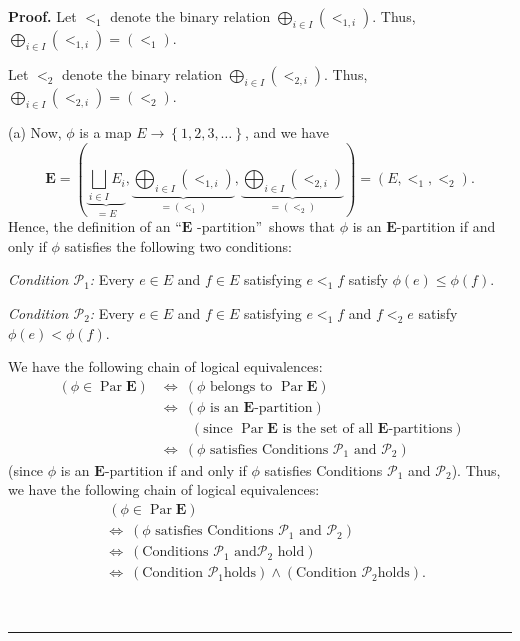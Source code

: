 \documentclass[numbers=enddot,12pt,final,onecolumn,notitlepage,abstracton]{scrartcl}
\theoremstyle{definition}
\newenvironment{proof}[1][Proof]{\noindent\textbf{#1.} }{\ \rule{0.5em}{0.5em}}
\newenvironment{verlong}{}{}
\begin{document}
\begin{verlong}
\begin{footnotesize}
\begin{proof}
Let $<_{1}$ denote the binary relation $\bigoplus_{i\in I}\left(
<_{1,i}\right)  $. Thus, $\bigoplus_{i\in I}\left(  <_{1,i}\right)  =\left(
<_{1}\right)  $.

Let $<_{2}$ denote the binary relation $\bigoplus_{i\in I}\left(
<_{2,i}\right)  $. Thus, $\bigoplus_{i\in I}\left(  <_{2,i}\right)  =\left(
<_{2}\right)  $.

(a) Now, $\phi$ is a map $E\rightarrow\left\{  1,2,3,\ldots\right\}  $, and we
have%
\[
\mathbf{E}=\left(  \underbrace{\bigsqcup_{i\in I}E_{i}}_{=E}%
,\underbrace{\bigoplus_{i\in I}\left(  <_{1,i}\right)  }_{=\left(
<_{1}\right)  },\underbrace{\bigoplus_{i\in I}\left(  <_{2,i}\right)
}_{=\left(  <_{2}\right)  }\right)  =\left(  E,<_{1},<_{2}\right)  .
\]
Hence, the definition of an \textquotedblleft$\mathbf{E}$%
-partition\textquotedblright\ shows that $\phi$ is an $\mathbf{E}$-partition
if and only if $\phi$ satisfies the following two conditions:

\textit{Condition $\mathcal{P}$}$_{1}$\textit{:} Every $e\in E$ and $f\in E$
satisfying $e<_{1}f$ satisfy $\phi\left(  e\right)  \leq\phi\left(  f\right)
$.

\textit{Condition $\mathcal{P}$}$_{2}$\textit{:} Every $e\in E$ and $f\in E$
satisfying $e<_{1}f$ and $f<_{2}e$ satisfy $\phi\left(  e\right)  <\phi\left(
f\right)  $.

We have the following chain of logical equivalences:%
\begin{align*}
\ \left(  \phi\in\operatorname*{Par}\mathbf{E}\right)   &  \Longleftrightarrow
\ \left(  \phi\text{ belongs to }\operatorname*{Par}\mathbf{E}\right) \\
&  \Longleftrightarrow\ \left(  \phi\text{ is an }\mathbf{E}\text{-partition}%
\right) \\
&  \ \ \ \ \ \ \ \ \ \ \left(  \text{since }\operatorname*{Par}\mathbf{E}%
\text{ is the set of all }\mathbf{E}\text{-partitions}\right) \\
&  \Longleftrightarrow\ \left(  \phi\text{ satisfies Conditions }%
\mathcal{P}_{1}\text{ and }\mathcal{P}_{2}\right)
\end{align*}
(since $\phi$ is an $\mathbf{E}$-partition if and only if $\phi$ satisfies
Conditions $\mathcal{P}_{1}$ and $\mathcal{P}_{2}$). Thus, we have the
following chain of logical equivalences:%
\begin{align}
&  \ \left(  \phi\in\operatorname*{Par}\mathbf{E}\right) \nonumber\\
&  \Longleftrightarrow\ \left(  \phi\text{ satisfies Conditions }%
\mathcal{P}_{1}\text{ and }\mathcal{P}_{2}\right) \nonumber\\
&  \Longleftrightarrow\ \left(  \text{Conditions }\mathcal{P}_{1}\text{ and
}\mathcal{P}_{2}\text{ hold}\right) \nonumber\\
&  \Longleftrightarrow\ \left(  \text{Condition }\mathcal{P}_{1}\text{
holds}\right)  \wedge\left(  \text{Condition }\mathcal{P}_{2}\text{
holds}\right)  . \label{pf.prop.djun.Epars.eq1}%
\end{align}



\end{proof}
\end{footnotesize}
\end{verlong}
\end{document}
